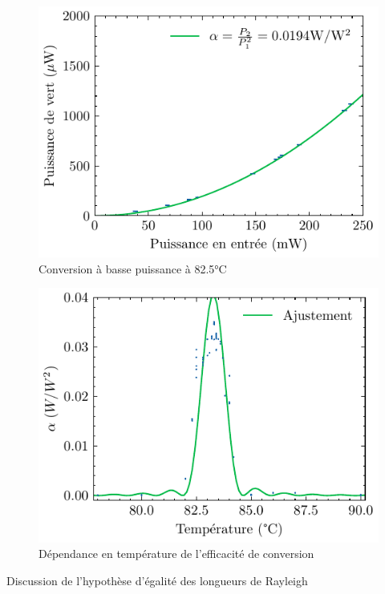 \documentclass[11pt,a4paper]{article}
\begin{document}
\begin{figure}[h]
    \centering
    \includegraphics{../donnees/conversion basse puissance 82.5 C.pdf}
    \caption{Conversion à basse puissance à 82.5°C}
\end{figure}

\begin{figure}[h]
	\centering
	\includegraphics{./img/alpha bp.pdf}
	\caption{Dépendance en température de l'efficacité de conversion}
	\label{fig:alphabp}
\end{figure}

Discussion de l'hypothèse d'égalité des longueurs de Rayleigh
\end{document}
